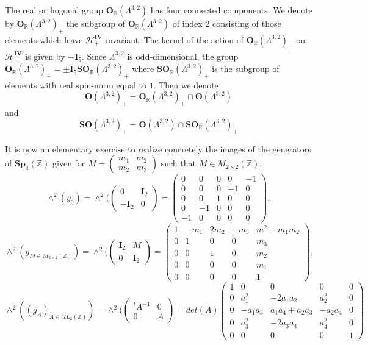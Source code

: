 \documentclass[9pt]{amsart} \usepackage[utf8]{inputenc}
\newcommand{\Z}{\mathbb{Z}} \newcommand{\C}{\mathbb{C}}
\newcommand{\R}{\mathbb{R}} \newcommand{\La}{\Lambda}
\newcommand{\Sp}{\mathbf{Sp}}
\newcommand{\Orth}{\mathbf{O}}
\newcommand{\SO}{\mathbf{SO}}
\newcommand{\Hpl}{\mathcal{H}}
\newcommand{\IV}{\mathbf{IV}}
\newcommand{\Id}{\mathbf{I}}
\begin{document}
The real orthogonal group $\Orth_{\R}(\La^{3,2})$ has four connected
components. We denote by $\Orth_{\R}(\La^{3,2})_+$ the subgroup of
$\Orth_{\R}(\La^{3,2})$ of index $2$ consisting of those elements which
leave $\Hpl_+^{\IV}$ invariant. The kernel of the action of
$\Orth_{\R}(\La^{3,2})_+$ on $\Hpl_+^{\IV}$ is given by $\pm \Id_5$. Since
$\La^{3,2}$ is odd-dimensional, the group $\Orth_{\R}(\La^{3,2})_+ =
\pm\Id_5\SO_{\R}(\La^{3,2})_+$ where $\SO_{\R}(\La^{3,2})_+$ is the
subgroup of elements with real spin-norm equal to $1$. Then we denote
$$\Orth(\La^{3,2})_+ = \Orth_{\R}(\La^{3,2})_+ \cap \Orth(\La^{3,2})$$
and $$\SO(\La^{3,2})_+ = \Orth(\La^{3,2}) \cap \SO_{\R}(\La^{3,2})_+$$

It is now an elementary exercise to realize concretely the images of the
generators of $\Sp_4(\Z)$ given for $M=\begin{pmatrix} m_1 & m_2\\
m_2 & m_3\end{pmatrix}$ such that $M \in M_{2\times2}(\Z)$,
$$\wedge^2(g_0) = \wedge^2(\begin{pmatrix}0 & \Id_2 \\ -\Id_2 &
0\end{pmatrix} = \begin{pmatrix}
0 & 0 & 0 & 0 & -1\\
0 & 0 & 0 & -1 & 0\\
0 & 0 & 1 & 0 & 0\\
0 & -1 & 0 & 0 & 0\\
-1 & 0 & 0 & 0 & 0
\end{pmatrix},$$
$$\wedge^2(g_{M \in M_{2\times2}(\Z)}) = \wedge^2(\begin{pmatrix}\Id_2 & M\\ 0 &
\Id_2\end{pmatrix} = \begin{pmatrix}1 & -m_1 & 2m_2 & -m_3 & m^2 - m_1 m_2\\
0 & 1 & 0 & 0 & m_3\\
0 & 0 & 1 & 0 & m_2\\
0 & 0 & 0 & 0 & m_1\\
0 & 0 & 0 & 0 & 1\end{pmatrix},$$
$$\wedge^2((g_A)_{A\in GL_2(\Z)}) = \wedge^2(\begin{pmatrix}{}^tA^{-1} &
0\\0 & A\end{pmatrix} = det(A)\begin{pmatrix}1 & 0 & 0 & 0 & 0\\
0 & a_1^2 & -2a_1a_2 & a_2^2 & 0\\
0 & -a_1a_3 & a_1a_4 + a_2a_3 & -a_2a_4 & 0\\
0 & a_3^2 & -2a_3a_4 & a_4^2 & 0\\
0 & 0 & 0 & 0 & 1\end{pmatrix}$$
\end{document}
